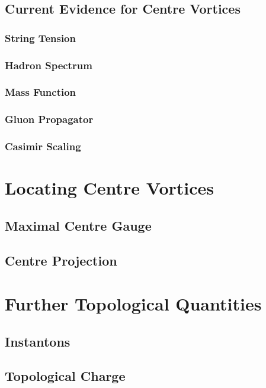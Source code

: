 \subsection{Current Evidence for Centre Vortices}
\subsubsection{String Tension}

\subsubsection{Hadron Spectrum}

\subsubsection{Mass Function}

\subsubsection{Gluon Propagator}

\subsubsection{Casimir Scaling}


\section{Locating Centre Vortices}\label{sec:LocatingVortices}
\subsection{Maximal Centre Gauge}\label{sec:MCG}
\subsection{Centre Projection}
\section{Further Topological Quantities}
\subsection{Instantons}
\subsection{Topological Charge}

